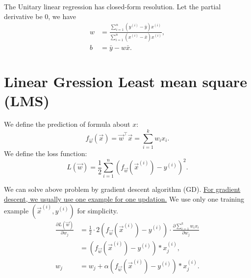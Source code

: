 \documentclass[10pt,onecolumn]{book}
\begin{document}
The Unitary linear regression has closed-form resolution. Let the partial derivative be 0, we have  
\begin{equation}
\begin{split}
w &= \frac{\sum_{i=1}^n (y^{(i)} - \bar{y}) x^{(i)}}{\sum_{i=1}^n (x^{(i)} - \bar{x}) x^{(i)}}, \\
b &= \bar{y} - w \bar{x}.
\end{split}
\end{equation}

\section{Linear Gression Least mean square (LMS)} 
We define the prediction of formula about $x$:
\begin{equation}
f_{\vec{w}}(\vec{x}) = \vec{w}^\top \vec{x} = \sum_{i = 1}^k w_i x_i.
\end{equation}
We define the loss function:
\begin{equation}
L(\vec{w}) = \frac{1}{2} \sum_{i=1}^n (f_{\vec{w}}(\vec{x}^{(i)}) - y^{(i)})^2.
\end{equation}

We can solve above problem by gradient descent algorithm (GD). \uline{For gradient descent, we usually use one example for one updation.} We use only one training example $(\vec{x}^{(i)}, y^{(i)})$ for simplicity.
\begin{equation}
\begin{split}
\frac{\partial L(\vec{w})}{\partial w_j} & = \frac{1}{2} \cdot 2 (f_{\vec{w}}(\vec{x}^{(i)}) - y^{(i)}) \cdot \frac{\partial \sum_{i = 1}^k w_i x_i}{\partial w_j} \\
	&= (f_{\vec{w}}(\vec{x}^{(i)}) - y^{(i)}) * x^{(i)}_j, \\
w_j &= w_j + \alpha (f_{\vec{w}}(\vec{x}^{(i)}) - y^{(i)}) * x^{(i)}_j.
\end{split}
\end{equation}
\end{document}
